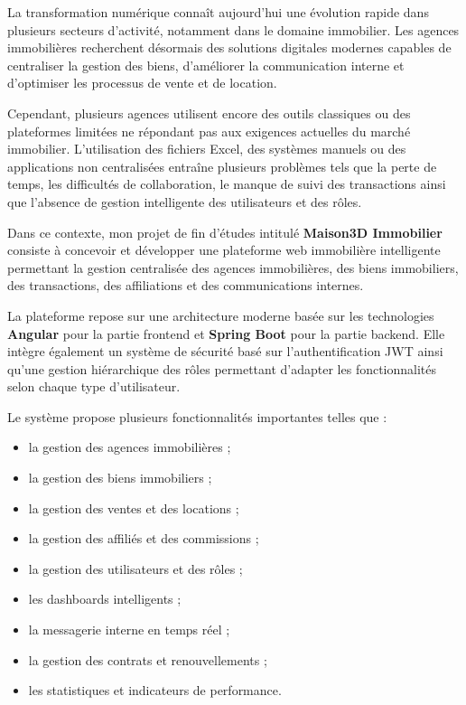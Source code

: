\documentclass[a4paper,12pt]{report}
\newcommand{\introspacing}{%
\renewcommand{\baselinestretch}{0.9}\normalsize%
}
\begin{document}

\begingroup
\introspacing

La transformation numérique connaît aujourd'hui une évolution rapide dans plusieurs secteurs d'activité, notamment dans le domaine immobilier. Les agences immobilières recherchent désormais des solutions digitales modernes capables de centraliser la gestion des biens, d'améliorer la communication interne et d'optimiser les processus de vente et de location.

Cependant, plusieurs agences utilisent encore des outils classiques ou des plateformes limitées ne répondant pas aux exigences actuelles du marché immobilier. L'utilisation des fichiers Excel, des systèmes manuels ou des applications non centralisées entraîne plusieurs problèmes tels que la perte de temps, les difficultés de collaboration, le manque de suivi des transactions ainsi que l'absence de gestion intelligente des utilisateurs et des rôles.

Dans ce contexte, mon projet de fin d'études intitulé \textbf{Maison3D Immobilier} consiste à concevoir et développer une plateforme web immobilière intelligente permettant la gestion centralisée des agences immobilières, des biens immobiliers, des transactions, des affiliations et des communications internes.

La plateforme repose sur une architecture moderne basée sur les technologies \textbf{Angular} pour la partie frontend et \textbf{Spring Boot} pour la partie backend. Elle intègre également un système de sécurité basé sur l'authentification JWT ainsi qu'une gestion hiérarchique des rôles permettant d'adapter les fonctionnalités selon chaque type d'utilisateur.

Le système propose plusieurs fonctionnalités importantes telles que :

\begin{itemize}
\item la gestion des agences immobilières ;
\item la gestion des biens immobiliers ;
\item la gestion des ventes et des locations ;
\item la gestion des affiliés et des commissions ;
\item la gestion des utilisateurs et des rôles ;
\item les dashboards intelligents ;
\item la messagerie interne en temps réel ;
\item la gestion des contrats et renouvellements ;
\item les statistiques et indicateurs de performance.
\end{itemize}
\end{document}
